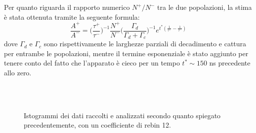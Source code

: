 \documentclass[11pt, oneside, a4paper]{article}   	%
\begin{document}
Per quanto riguarda il rapporto numerico $N^+/N^-$ tra le due popolazioni, la stima è stata ottenuta tramite la seguente formula: 
\[\frac{A^+}{A^-}= \bigg ( \frac{\tau^+}{\tau^-} \bigg )  ^{-1} \frac{N^+}{N^-} \bigg ( \frac{\Gamma_d}{\Gamma_d+\Gamma_c} \bigg )^{-1}e^{t^*\left(\frac{1}{\tau^+}-\frac{1}{\tau^-}\right)}\]
dove $\Gamma_d$ e $\Gamma_c$ sono rispettivamente le larghezze parziali di decadimento e cattura per entrambe le popolazioni, mentre il termine esponenziale è stato aggiunto per tenere conto del fatto che l'apparato è cieco per un tempo $t^* \sim 150$ ns precedente allo zero.
%
\begin{figure}[H]
\centering
{} \\
 \\
\caption{Istogrammi dei dati raccolti e analizzati secondo quanto spiegato precedentemente, con un coefficiente di rebin 12.}
\label{fig::histo}
\end{figure}
\end{document}
